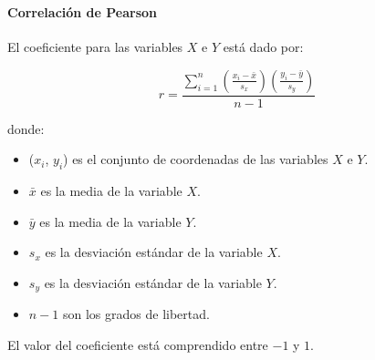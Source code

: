 \begin{frame}[noframenumbering]
\frametitle{\apendixframetitle}
\framesubtitle{Correlación de Pearson}

\scriptsize
El coeficiente para las variables $X$ e $Y$ está dado por:

\begin{equation}
r = \frac{\sum_{i=1}^n{(\frac{x_i-\bar{x}}{s_x})({\frac{y_i-\bar{y}}{s_y}})}}%
{n - 1}
\end{equation}

donde:

\begin{itemize}
    \item ($x_i$, $y_i$) es el conjunto de coordenadas de las variables $X$ e $Y$.
    \item $\bar{x}$ es la media de la variable $X$.
    \item $\bar{y}$ es la media de la variable $Y$.
    \item $s_x$ es la desviación estándar de la variable $X$.
    \item $s_y$ es la desviación estándar de la variable $Y$.
    \item $n - 1$ son los grados de libertad.
\end{itemize}

El valor del coeficiente está comprendido entre $-1$ y $1$.

\end{frame}

